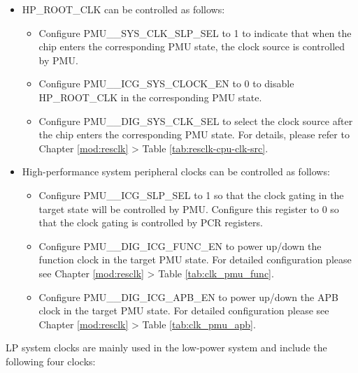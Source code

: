 \documentclass[main\_\_EN.tex]{subfiles}
\begin{document}
\begin{itemize}

\item HP\_ROOT\_CLK can be controlled as follows:

    \begin{itemize}
    \item Configure PMU\_\_SYS\_CLK\_SLP\_SEL to 1 to indicate that when the chip enters the corresponding PMU state, the clock source is controlled by PMU.

    \item Configure PMU\_\_ICG\_SYS\_CLOCK\_EN to 0 to disable HP\_ROOT\_CLK in the corresponding PMU state.

    \item Configure PMU\_\_DIG\_SYS\_CLK\_SEL to select the clock source after the chip enters the corresponding PMU state. For details, please refer to Chapter \ref{mod:resclk} \textit{} > Table \ref{tab:resclk-cpu-clk-src}.
    \end{itemize}

\item High-performance system peripheral clocks can be controlled as follows:

    \begin{itemize}
    \item Configure PMU\_\_ICG\_SLP\_SEL to 1 so that the clock gating in the target state will be controlled by PMU. Configure this register to 0 so that the clock gating is controlled by PCR registers.

    \item Configure PMU\_\_DIG\_ICG\_FUNC\_EN to power up/down the function clock in the target PMU state. For detailed configuration please see Chapter \ref{mod:resclk} \textit{} > Table \ref{tab:clk_pmu_func}.

    \item Configure PMU\_\_DIG\_ICG\_APB\_EN to power up/down the APB clock in the target PMU state. For detailed configuration please see Chapter \ref{mod:resclk} \textit{} > Table \ref{tab:clk_pmu_apb}.

    \end{itemize}

\end{itemize}

LP system clocks are mainly used in the low-power system and include the following four clocks:
\end{document}
